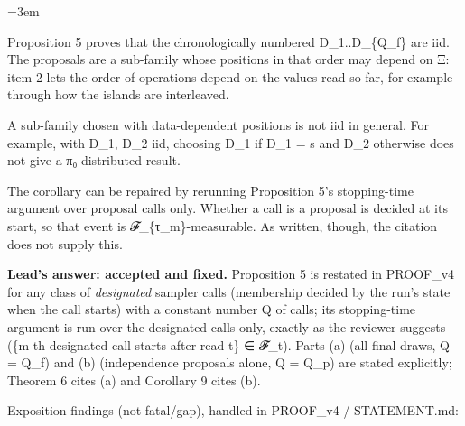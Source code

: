 \documentclass[11pt]{report}
\newenvironment{mdblock}{\begingroup\mdfont\raggedright\setlength{\parindent}{0pt}\setlength{\parskip}{0.55em}\emergencystretch=3em}{\par\endgroup}
\newenvironment{mdquote}{\begin{list}{}{\setlength{\leftmargin}{1.2em}\setlength{\rightmargin}{0pt}\setlength{\topsep}{2pt}\setlength{\parsep}{0.55em}\setlength{\itemsep}{0pt}}\item\relax}{\end{list}}
\begin{document}
\begin{mdblock}
\begin{mdquote}
\begin{mdbul}
\begin{mdbul}
\item Proposition 5 proves that the chronologically numbered D\_1..D\_\{Q\_f\} are iid. The proposals are a sub-family whose positions in that order may depend on Ξ: item 2 lets the order of operations depend on the values read so far, for example through how the islands are interleaved.
\item A sub-family chosen with data-dependent positions is not iid in general. For example, with D\_1, D\_2 iid, choosing D\_1 if D\_1 = s and D\_2 otherwise does not give a π₀-distributed result.
\item The corollary can be repaired by rerunning Proposition 5's stopping-time argument over proposal calls only. Whether a call is a proposal is decided at its start, so that event is 𝓕\_\{τ\_m\}-measurable. As written, though, the citation does not supply this.
\end{mdbul}
\end{mdbul}
\end{mdquote}

\textbf{Lead's answer: accepted and fixed.} Proposition 5 is restated in PROOF\_v4 for any class of \emph{designated} sampler calls (membership decided by the run's state when the call starts) with a constant number Q of calls; its stopping-time argument is run over the designated calls only, exactly as the reviewer suggests (\{m-th designated call starts after read t\} ∈ 𝓕\_t). Parts (a) (all final draws, Q = Q\_f) and (b) (independence proposals alone, Q = Q\_p) are stated explicitly; Theorem 6 cites (a) and Corollary 9 cites (b).

Exposition findings (not fatal/gap), handled in PROOF\_v4 / STATEMENT.md:


\end{mdblock}
\end{document}
